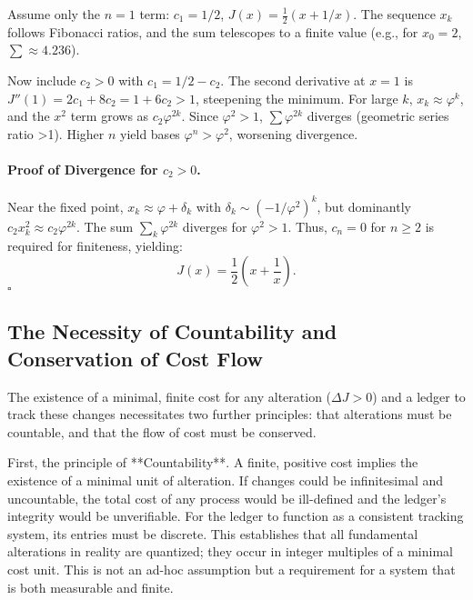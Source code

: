 Assume only the \(n=1\) term: \(c_1 = 1/2\), \(J(x) = \frac{1}{2} (x + 1/x)\). The sequence \(x_k\) follows Fibonacci ratios, and the sum telescopes to a finite value (e.g., for \(x_0=2\), \(\sum \approx 4.236\)).

Now include \(c_2 > 0\) with \(c_1 = 1/2 - c_2\). The second derivative at \(x=1\) is \(J''(1) = 2c_1 + 8c_2 = 1 + 6c_2 > 1\), steepening the minimum. For large \(k\), \(x_k \approx \varphi^k\), and the \(x^2\) term grows as \(c_2 \varphi^{2k}\). Since \(\varphi^2 > 1\), \(\sum \varphi^{2k}\) diverges (geometric series ratio >1). Higher \(n\) yield bases \(\varphi^n > \varphi^2\), worsening divergence.

\paragraph{Proof of Divergence for \(c_2 > 0\).} Near the fixed point, \(x_k \approx \varphi + \delta_k\) with \(\delta_k \sim (-1/\varphi^2)^k\), but dominantly \(c_2 x_k^2 \approx c_2 \varphi^{2k}\). The sum \(\sum_k \varphi^{2k}\) diverges for \(\varphi^2 > 1\). Thus, \(c_n = 0\) for \(n \geq 2\) is required for finiteness, yielding:
\begin{equation}
\boxed{J(x) = \frac{1}{2}\left(x + \frac{1}{x}\right)}.
\end{equation}
\hfill$\square$

\subsection{The Necessity of Countability and Conservation of Cost Flow}
The existence of a minimal, finite cost for any alteration (\(\Delta J > 0\)) and a ledger to track these changes necessitates two further principles: that alterations must be countable, and that the flow of cost must be conserved.

First, the principle of **Countability**. A finite, positive cost implies the existence of a minimal unit of alteration. If changes could be infinitesimal and uncountable, the total cost of any process would be ill-defined and the ledger's integrity would be unverifiable. For the ledger to function as a consistent tracking system, its entries must be discrete. This establishes that all fundamental alterations in reality are quantized; they occur in integer multiples of a minimal cost unit. This is not an ad-hoc assumption but a requirement for a system that is both measurable and finite.

